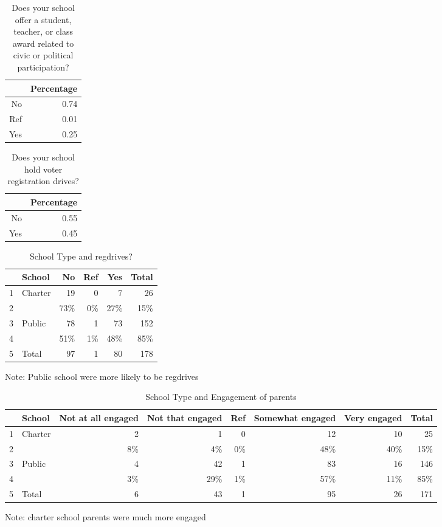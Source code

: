 \documentclass[12pt]{article}
\begin{document}
\begin{table}[ht]
\caption {Does your school offer a student, teacher, or class award related to civic or political participation?}
\centering
\begin{tabular}{rr}
  \hline
 & Percentage \\ 
  \hline
No & 0.74 \\ 
  Ref & 0.01 \\ 
  Yes & 0.25 \\ 
   \hline
\end{tabular}
\end{table}

\begin{table}[ht]
\caption {Does your school hold voter registration drives?}
\centering
\begin{tabular}{rr}
  \hline
 & Percentage \\ 
  \hline
No & 0.55 \\ 
  Yes & 0.45 \\ 
   \hline
\end{tabular}
\end{table}

\begin{table}[ht]
\caption{School Type and regdrives?} 
\centering
\begin{tabular}{llrrrr}
  \hline
 & School & No & Ref & Yes & Total \\ 
  \hline
1 & Charter & 19 & 0 & 7 & 26 \\ 
  2 &   & 73\% & 0\% & 27\% & 15\% \\ 
  3 & Public & 78 & 1 & 73 & 152 \\ 
  4 &   & 51\% & 1\% & 48\% & 85\% \\ 
  5 & Total & 97 & 1 & 80 & 178 \\ 
   \hline
\end{tabular}
\begin{tablenotes}
      \small
      \item Note: Public school were more likely to be regdrives
    \end{tablenotes}
\end{table}

\begin{table}[ht]
\caption{School Type and Engagement of parents}
\centering
\begin{tabular}{llrrrrrr}
  \hline
 & School & Not at all engaged & Not that engaged & Ref & Somewhat engaged & Very engaged & Total \\ 
  \hline
1 & Charter & 2 & 1 & 0 & 12 & 10 & 25 \\ 
  2 &   & 8\% & 4\% & 0\% & 48\% & 40\% & 15\% \\ 
  3 & Public & 4 & 42 & 1 & 83 & 16 & 146 \\ 
  4 &   & 3\% & 29\% & 1\% & 57\% & 11\% & 85\% \\ 
  5 & Total & 6 & 43 & 1 & 95 & 26 & 171 \\ 
   \hline
\end{tabular}
\begin{tablenotes}
      \small
      \item Note: charter school parents were much more engaged
    \end{tablenotes}
\end{table}
\end{document}
